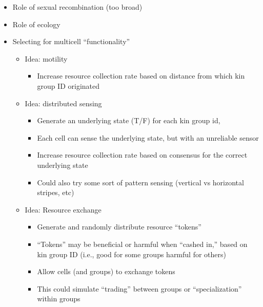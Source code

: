 \begin{itemize}
  \item Role of sexual recombination (too broad)
  \item Role of ecology
  \item Selecting for multicell ``functionality''
  \begin{itemize}
    \item Idea: motility
    \begin{itemize}
      \item Increase resource collection rate based on distance from which kin group ID originated
    \end{itemize}
    \item Idea: distributed sensing
    \begin{itemize}
      \item Generate an underlying state (T/F) for each kin group id,
      \item Each cell can sense the underlying state, but with an unreliable sensor
      \item Increase resource collection rate based on consensus for the correct underlying state
      \item Could also try some sort of pattern sensing (vertical vs horizontal stripes, etc)
    \end{itemize}
    \item Idea: Resource exchange
    \begin{itemize}
      \item Generate and randomly distribute resource ``tokens''
      \item ``Tokens'' may be beneficial or harmful when ``cashed in,'' based on kin group ID (i.e., good for some groups harmful for others)
      \item Allow cells (and groups) to exchange tokens
      \item This could simulate “trading” between groups or “specialization” within groups
    \end{itemize}
  \end{itemize}
\end{itemize}
